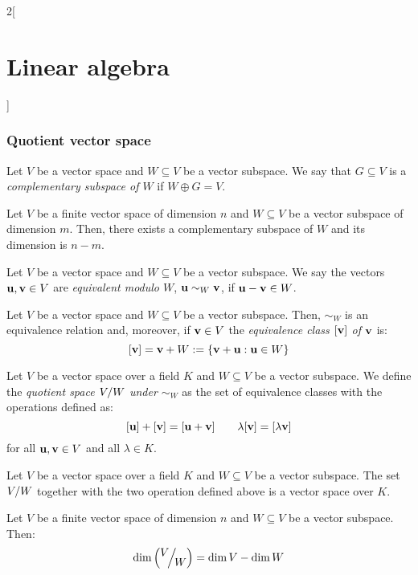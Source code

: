 \documentclass[../../../main.tex]{subfiles}
\begin{document}
\begin{multicols}{2}[\section{Linear algebra}]
  \subsubsection*{Quotient vector space}
  \begin{definition}
    Let $V$ be a vector space and $W\subseteq V$ be a vector subspace. We say that $G\subseteq V$ is a \textit{complementary subspace of $W$} if $W\oplus G=V$.
  \end{definition}
  \begin{definition}
    Let $V$ be a finite vector space of dimension $n$ and $W\subseteq V$ be a vector subspace of dimension $m$. Then, there exists a complementary subspace of $W$ and its dimension is $n-m$.
  \end{definition}
  \begin{definition}
    Let $V$ be a vector space and $W\subseteq V$ be a vector subspace. We say the vectors $\vb{u},\vb{v}\in V$ are \textit{equivalent modulo $W$}, $\vb{u}\sim_W\vb{v}$, if $\vb{u}-\vb{v}\in W$.
  \end{definition}
  \begin{lemma}
    Let $V$ be a vector space and $W\subseteq V$ be a vector subspace. Then, $\sim_W$ is an equivalence relation and, moreover, if $\vb{v}\in V$ the \textit{equivalence class $[\vb{v}]$ of $\vb{v}$} is: $$[\vb{v}]=\vb{v}+W:=\{\vb{v}+\vb{u}:\vb{u}\in W\}$$
  \end{lemma}
  \begin{definition}
    Let $V$ be a vector space over a field $K$ and $W\subseteq V$ be a vector subspace. We define the \textit{quotient space $\quot{V}{W}$ under $\sim_W$} as the set of equivalence classes with the operations defined as:
    $$[\vb{u}]+[\vb{v}]=[\vb{u}+\vb{v}]\qquad \lambda[\vb{v}]=[\lambda\vb{v}]$$
    for all $\vb{u},\vb{v}\in V$ and all $\lambda\in K$.
  \end{definition}
  \begin{prop}
    Let $V$ be a vector space over a field $K$ and $W\subseteq V$ be a vector subspace. The set $\quot{V}{W}$ together with the two operation defined above is a vector space over $K$.
  \end{prop}
  \begin{prop}
    Let $V$ be a finite vector space of dimension $n$ and $W\subseteq V$ be a vector subspace. Then: $$\dim\left(\quot{V}{W}\right)=\dim V-\dim W$$
  \end{prop}

\end{multicols}
\end{document}
